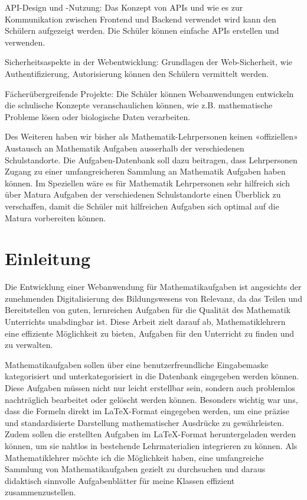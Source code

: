 \documentclass[12pt,a4paper]{article} %
\begin{document}
API-Design und -Nutzung: Das Konzept von APIs und wie es zur Kommunikation zwischen Frontend und Backend verwendet wird kann den Schülern aufgezeigt werden. Die Schüler können einfache APIs erstellen und verwenden.

Sicherheitsaspekte in der Webentwicklung: Grundlagen der Web-Sicherheit, wie Authentifizierung, Autorisierung können den Schülern vermittelt werden.

Fächerübergreifende Projekte: Die Schüler können Webanwendungen entwickeln die schulische Konzepte veranschaulichen können, wie z.B. mathematische Probleme lösen oder biologische Daten verarbeiten.

Des Weiteren haben wir bisher als Mathematik-Lehrpersonen keinen «offiziellen» Austausch an Mathematik Aufgaben ausserhalb der verschiedenen Schulstandorte. Die Aufgaben-Datenbank soll dazu beitragen, dass Lehrpersonen Zugang zu einer umfangreicheren Sammlung an Mathematik Aufgaben haben können. Im Speziellen wäre es für Mathematik Lehrpersonen sehr hilfreich sich über Matura Aufgaben der verschiedenen Schulstandorte einen Überblick zu verschaffen, damit die Schüler mit hilfreichen Aufgaben sich optimal auf die Matura vorbereiten können.



\section{Einleitung}
Die Entwicklung einer Webanwendung für Mathematikaufgaben ist angesichts der zunehmenden Digitalisierung des Bildungswesens von Relevanz, da das Teilen und Bereitstellen von guten, lernreichen Aufgaben für die Qualität des Mathematik Unterrichts unabdingbar ist. Diese Arbeit zielt darauf ab, Mathematiklehrern eine effiziente Möglichkeit zu bieten, Aufgaben für den Unterricht zu finden und zu verwalten.


Mathematikaufgaben sollen über eine benutzerfreundliche Eingabemaske kategorisiert und unterkategorisiert in die Datenbank eingegeben werden können. Diese Aufgaben müssen nicht nur leicht erstellbar sein, sondern auch problemlos nachträglich bearbeitet oder gelöscht werden können. Besonders wichtig war uns, dass die Formeln direkt im LaTeX-Format eingegeben werden, um eine präzise und standardisierte Darstellung mathematischer Ausdrücke zu gewährleisten. Zudem sollen die erstellten Aufgaben im LaTeX-Format heruntergeladen werden können, um sie nahtlos in bestehende Lehrmaterialien integrieren zu können. Als Mathematiklehrer möchte ich die Möglichkeit haben, eine umfangreiche Sammlung von Mathematikaufgaben gezielt zu durchsuchen und daraus didaktisch sinnvolle Aufgabenblätter für meine Klassen effizient zusammenzustellen.
\end{document}
